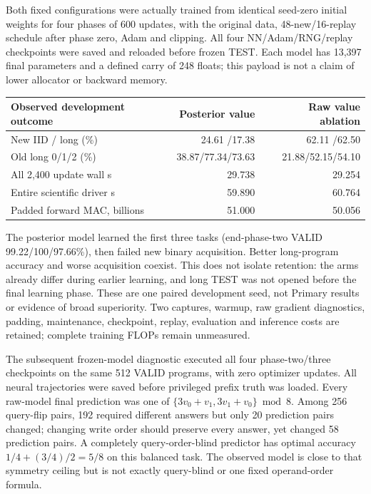 Both fixed configurations were actually trained from identical seed-zero
initial weights for four phases of 600 updates, with the original data,
48-new/16-replay schedule after phase zero, Adam and clipping. All four
NN/Adam/RNG/replay checkpoints were saved and reloaded before frozen TEST.
Each model has 13,397 final parameters and a defined carry of 248 floats;
this payload is not a claim of lower allocator or backward memory.

\begin{center}\small
\begin{tabular}{lrr}
\toprule
Observed development outcome & Posterior value & Raw value ablation\\
\midrule
New IID / long (\%) &24.61 /17.38&62.11 /62.50\\
Old long 0/1/2 (\%) &38.87/77.34/73.63&21.88/52.15/54.10\\
All 2,400 update wall s &29.738&29.254\\
Entire scientific driver s &59.890&60.764\\
Padded forward MAC, billions &51.000&50.056\\
\bottomrule
\end{tabular}
\end{center}
The posterior model learned the first three tasks (end-phase-two VALID
99.22/100/97.66\%), then failed new binary acquisition. Better long-program
accuracy and worse acquisition coexist. This does not isolate retention:
the arms already differ during earlier learning, and long TEST was not opened
before the final learning phase. These are one paired development
seed, not Primary results or evidence of broad superiority. Two captures,
warmup, raw gradient diagnostics, padding, maintenance, checkpoint, replay,
evaluation and inference costs are retained; complete training FLOPs remain
unmeasured.

The subsequent frozen-model diagnostic executed all four phase-two/three
checkpoints on the same 512 VALID programs, with zero optimizer updates.
All neural trajectories were saved before privileged prefix truth was loaded.
Every raw-model final prediction was one of
$\{3v_0+v_1,3v_1+v_0\}\bmod8$. Among 256 query-flip pairs, 192 required
different answers but only 20 prediction pairs changed; changing write order
should preserve every answer, yet changed 58 prediction pairs. A completely
query-order-blind predictor has optimal accuracy $1/4+(3/4)/2=5/8$ on this
balanced task. The observed model is close to that symmetry ceiling but is
not exactly query-blind or one fixed operand-order formula.


